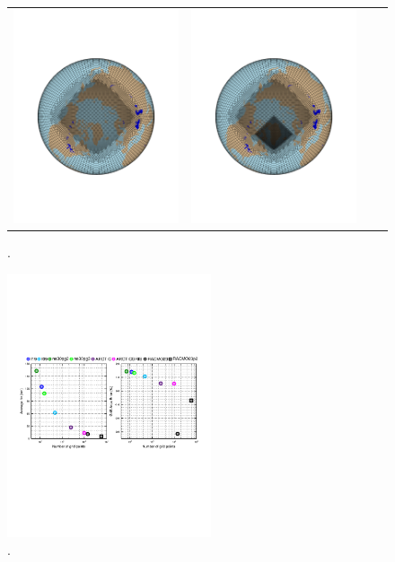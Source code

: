 \documentclass[draft]{agujournal2019}
\begin{document}
\begin{figure}[t]
\begin{center}
\begin{tabular}{cccc}
         \includegraphics[width=60mm]{figs/grid-ARCTIC.pdf}&
         \includegraphics[width=60mm]{figs/grid-ARCTICGRIS.pdf} \\
\end{tabular}
\end{center}
\caption{.}
\label{fig:vr-grids}
\end{figure}

\begin{figure}[t]
\begin{center}
         \includegraphics[width=60mm]{figs/temp_grisres.pdf}
\end{center}
\caption{.}
\label{fig:prect}
\end{figure}
\end{document}
